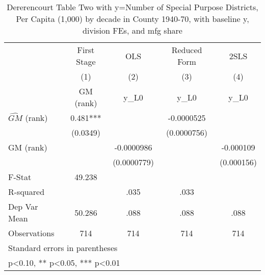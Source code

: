 \begin{table}[htbp]\centering
\def\sym#1{\ifmmode^{#1}\else\(^{#1}\)\fi}
\caption{Dererencourt Table Two with y=Number of Special Purpose Districts, Per Capita (1,000) by decade in County 1940-70, with baseline y, division FEs, and mfg share}
\begin{tabular}{l*{4}{c}}
\toprule
                    & First Stage   &         OLS   &Reduced Form   &        2SLS   \\
                    &\multicolumn{1}{c}{(1)}&\multicolumn{1}{c}{(2)}&\multicolumn{1}{c}{(3)}&\multicolumn{1}{c}{(4)}\\
                    &\multicolumn{1}{c}{GM  (rank)}&\multicolumn{1}{c}{y\_L0}&\multicolumn{1}{c}{y\_L0}&\multicolumn{1}{c}{y\_L0}\\
\midrule
$\hat{GM}$ (rank)   &       0.481***&               &  -0.0000525   &               \\
                    &    (0.0349)   &               & (0.0000756)   &               \\
\addlinespace
GM  (rank)          &               &  -0.0000986   &               &   -0.000109   \\
                    &               & (0.0000779)   &               &  (0.000156)   \\
\midrule
F-Stat              &      49.238   &               &               &               \\
R-squared           &               &        .035   &        .033   &               \\
Dep Var Mean        &      50.286   &        .088   &        .088   &        .088   \\
Observations        &         714   &         714   &         714   &         714   \\
\bottomrule
\multicolumn{5}{l}{\footnotesize Standard errors in parentheses}\\
\multicolumn{5}{l}{\footnotesize * p<0.10, ** p<0.05, *** p<0.01}\\
\end{tabular}
\end{table}
